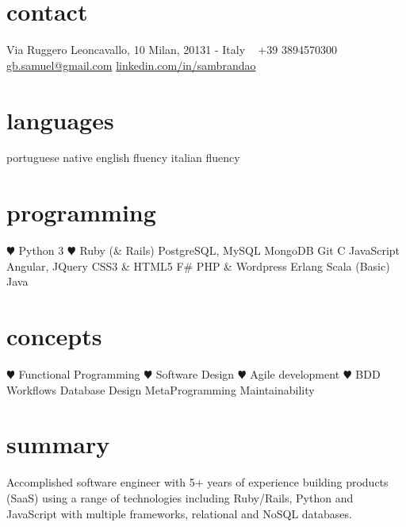 \documentclass[]{friggeri-cv} %
\begin{document}


\begin{aside} %
\section{contact}
Via Ruggero 
Leoncavallo, 10
Milan, 20131 - Italy
~
+39 3894570300
~
\href{mailto:gb.samuel@gmail.com}{gb.samuel@gmail.com}
\href{it.linkedin.com/in/sambrandao}{linkedin.com/in/sambrandao}
\section{languages}
portuguese native
english fluency
italian fluency
\section{programming}
{\color{red} $\varheartsuit$} Python 3
{\color{red} $\varheartsuit$} Ruby (\& Rails)
PostgreSQL, MySQL
MongoDB
Git
C
JavaScript
Angular, JQuery
CSS3 \& HTML5
F\#
PHP \& Wordpress
Erlang
Scala (Basic)
Java
\section{concepts}
{\color{red} $\varheartsuit$} Functional Programming
{\color{red} $\varheartsuit$} Software Design
{\color{red} $\varheartsuit$} Agile development
{\color{red} $\varheartsuit$} BDD Workflows
Database Design
MetaProgramming
Maintainability
\end{aside}


\section{summary}
Accomplished software engineer with 5+ years of experience building products (SaaS) 
using a range of technologies including Ruby/Rails, Python and JavaScript with 
multiple frameworks, relational and NoSQL databases.
\end{document}
